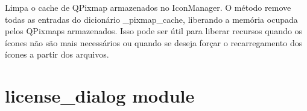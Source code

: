 \documentclass[letterpaper,10pt,english]{sphinxmanual}
\begin{document}
\begin{fulllineitems}
\begin{fulllineitems}
\label{\detokenize{api/icon_manager:icon_manager.IconManager.clear_cache}}
\pysigstartsignatures
\pysiglinewithargsret
{}
{}
{}
\pysigstopsignatures
\sphinxAtStartPar
Limpa o cache de QPixmap armazenados no IconManager. O método remove todas as entradas do dicionário \_pixmap\_cache, liberando a memória ocupada pelos QPixmaps armazenados. Isso pode ser útil para liberar recursos quando os ícones não são mais necessários ou quando se deseja forçar o recarregamento dos ícones a partir dos arquivos.
\begin{quote}\begin{description}
\sphinxAtStartPar
{}

\end{description}\end{quote}

\end{fulllineitems}


\end{fulllineitems}


\sphinxstepscope


\section{license\_dialog module}
\label{\detokenize{api/license_dialog:module-license_dialog}}\label{\detokenize{api/license_dialog:license-dialog-module}}\label{\detokenize{api/license_dialog::doc}}
\end{document}
